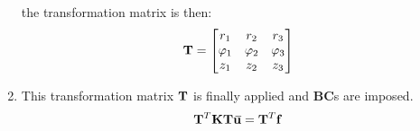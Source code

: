 \begin{bbox}
\begin{enumerate}
            the transformation matrix is then:
            \begin{equation}
                \mathbf{T} = \begin{bmatrix}
                    r_1 & r_2 & r_3 \\
                    \varphi_1 & \varphi_2 & \varphi_3 \\
                    z_1 & z_2 & z_3 \\
                \end{bmatrix}
            \end{equation}

        \item This transformation matrix $ \mathbf{T} $ is finally applied and
            \textbf{BC}s are imposed.
            \begin{equation}
                \mathbf{T}^T \mathbf{K} \mathbf{T} \mathbf{{}\mkern3mu\overline{\mkern-3muu}} = \mathbf{T}^T \mathbf{f}
            \end{equation}

    \end{enumerate}

\end{bbox}

